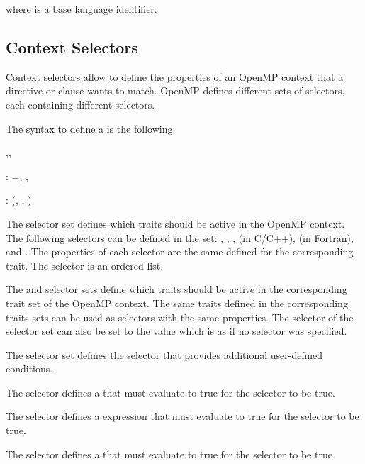 where  is a base language identifier.

\subsection{Context Selectors}
\label{subsec:Context Selectors} 

Context selectors allow to define the properties of an OpenMP context that a directive or clause wants to match. OpenMP defines different sets of selectors, each containing different selectors.

The syntax to define a  is the following:

\begin{ompSyntax}
\plc{trait-set-selector[},\plc{trait-set-selector[},\plc{...]]}

:
   ={\plc{trait-selector[}, \plc{trait-selector[}, \plc{...]]}}

:
   \plc{trait-selector-name[}(\plc{trait-property[}, \plc{trait-property[}, \plc{...]]})\plc{]}
\end{ompSyntax}

The  selector set defines which  traits should be active in the OpenMP context. The following selectors can be defined in the  set: , , ,  (in C/C++),  (in Fortran), and . The properties of each selector are the same defined for the corresponding trait. The  selector is an ordered list.

The  and  selector sets define which traits should be active in the corresponding trait set of the OpenMP context. The same traits defined in the corresponding traits sets can be used as selectors with the same properties. The  selector of the  selector set can also be set to the value  which is as if no  selector was specified. 

The  selector set defines the  selector that provides additional user-defined conditions. 
\begin{cspecific}
The \code{)} selector defines a  that must evaluate to true for the selector to be true. 
\end{cspecific}
\begin{cppspecific}
The \code{)} selector defines a  expression that must evaluate to true for the selector to be true.  
\end{cppspecific}
\begin{fortranspecific}
The \code{)} selector defines a  that must evaluate to true for the selector to be true. 
\end{fortranspecific}

